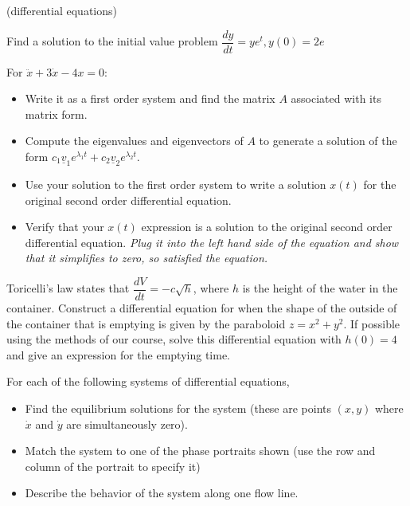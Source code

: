 \documentclass[12pt,letterpaper,noanswers]{exam}
\begin{document}
\begin{questions}
\question (differential equations)
\begin{parts}
\item Find a solution to the initial value problem $\dfrac{dy}{dt} = ye^t, y(0) = 2e$
\item For $\ddot x + 3 \dot x - 4x = 0$:
\begin{itemize}
\itemsep0em
\item Write it as a first order system and find the matrix $A$ associated with its matrix form.  
    \item Compute the eigenvalues and eigenvectors of $A$ to generate a solution of the form $c_1\underline v_1e^{\lambda_1 t} + c_2 \underline v_2e^{\lambda_2 t}$.
    \item Use your solution to the first order system to write a solution $x(t)$ for the original second order differential equation.
    \item Verify that your $x(t)$ expression is a solution to the original second order differential equation.  \emph{Plug it into the left hand side of the equation and show that it simplifies to zero, so satisfied the equation.}
\end{itemize}
\item Toricelli's law states that $\dfrac{dV}{dt} = - c\sqrt{h}$, where $h$ is the height of the water in the container.  Construct a differential equation for when the shape of the outside of the container that is emptying is given by the paraboloid $z = x^2+y^2$.  If possible using the methods of our course, solve this differential equation with $h(0) = 4$ and give an expression for the emptying time.
\end{parts}

\question For each of the following systems of differential equations, 
\begin{itemize}
\itemsep0em
    \item Find the equilibrium solutions for the system (these are points $(x,y)$ where $\dot x$ and $\dot y$ are simultaneously zero).
    \item Match the system to one of the phase portraits shown (use the row and column of the portrait to specify it)
    \item Describe the behavior of the system along one flow line.
\end{itemize} 
\end{questions}
\end{document}
